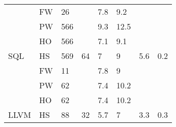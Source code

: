 \begin{figure*}[!t]
\begin{tabular}{|l|l|l|l|l|l|l|l|}
                                   & FW                              & 26                              &                                            & \cellcolor[HTML]{C0C0C0}7.8  & \cellcolor[HTML]{C0C0C0}9.2  &                       &                       \\ \cline{2-3} \cline{5-6}
                                   & PW                              & \cellcolor[HTML]{FD6864}566                             &                                            & \cellcolor[HTML]{C0C0C0}9.3  & \cellcolor[HTML]{C0C0C0}12.5 &                       &                       \\ \cline{2-3} \cline{5-6}
                                   & HO                              & \cellcolor[HTML]{FD6864}566                             &                                            & \cellcolor[HTML]{C0C0C0}7.1  & \cellcolor[HTML]{C0C0C0}9.1  &                       &                       \\ \cline{2-3} \cline{5-6}
\multirow{-4}{*}{SQL}              & HS                              & \cellcolor[HTML]{FD6864}569                             & \multirow{-4}{*}{64}                       & \cellcolor[HTML]{C0C0C0}7    & \cellcolor[HTML]{C0C0C0}9    & \multirow{-4}{*}{5.6} & \multirow{-4}{*}{0.2} \\ \hline
                                   & FW                              & 11                              &                                            & \cellcolor[HTML]{C0C0C0}7.8  & \cellcolor[HTML]{C0C0C0}9    &                       &                       \\ \cline{2-3} \cline{5-6}
                                   & PW                              & \cellcolor[HTML]{FD6864}62                              &                                            & \cellcolor[HTML]{C0C0C0}7.4  & \cellcolor[HTML]{C0C0C0}10.2 &                       &                       \\ \cline{2-3} \cline{5-6}
                                   & HO                              & \cellcolor[HTML]{FD6864}62                              &                                            & \cellcolor[HTML]{C0C0C0}7.4  & \cellcolor[HTML]{C0C0C0}10.2 &                       &                       \\ \cline{2-3} \cline{5-6}
\multirow{-4}{*}{LLVM}             & HS                              & \cellcolor[HTML]{FD6864}88                              & \multirow{-4}{*}{32}                       & \cellcolor[HTML]{C0C0C0}5.7  & \cellcolor[HTML]{C0C0C0}7    & \multirow{-4}{*}{3.3} & \multirow{-4}{*}{0.3} \\ \hline

\end{tabular}
\end{figure*}
